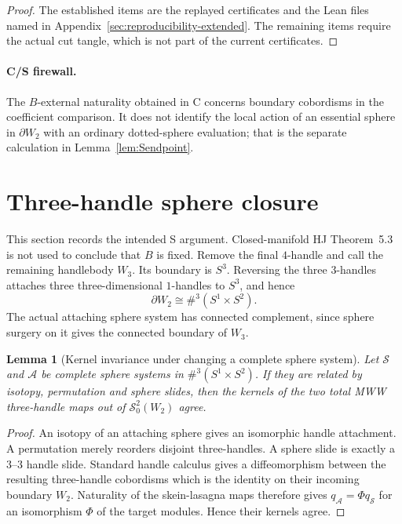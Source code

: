 \documentclass[11pt]{amsart}
\newtheorem{lemma}[theorem]{Lemma}
\theoremstyle{definition}
\theoremstyle{remark}
\begin{document}
\begin{proof}
The established items are the replayed certificates and the Lean files
named in Appendix~\ref{sec:reproducibility-extended}.  The remaining items
require the actual cut tangle, which is not part of the current
certificates.
\end{proof}

\paragraph{C/S firewall.}
The $B$-external naturality obtained in C concerns boundary cobordisms in
the coefficient comparison.  It does not identify the local action of an
essential sphere in $\partial W_2$ with an ordinary dotted-sphere evaluation;
that is the separate calculation in Lemma~\ref{lem:Sendpoint}.

\section{Three-handle sphere closure}\label{sec:s-closure}

This section records the intended S argument.  Closed-manifold HJ
Theorem~5.3 is not used to conclude that $B$ is fixed.  Remove the final $4$-handle and call the
remaining handlebody $W_3$.  Its boundary is $S^3$.  Reversing the three
$3$-handles attaches three three-dimensional $1$-handles to $S^3$, and hence
\[
\partial W_2\cong\#^3(S^1\times S^2).
\]
The actual attaching sphere system has connected complement, since sphere
surgery on it gives the connected boundary of $W_3$.

\begin{lemma}[Kernel invariance under changing a complete sphere system]
\label{lem:Ssystem}
Let \(\mathcal S\) and \(\mathcal A\) be complete sphere systems in
\(\#^3(S^1\times S^2)\).  If they are related by isotopy, permutation and
sphere slides, then the kernels of the two total MWW three-handle maps out of
\(\mathcal S^2_0(W_2)\) agree.
\end{lemma}

\begin{proof}
An isotopy of an attaching sphere gives an isomorphic handle attachment.
A permutation merely reorders disjoint three-handles.  A sphere slide is
exactly a \(3\)--\(3\) handle slide.  Standard handle calculus gives a
diffeomorphism between the resulting three-handle cobordisms which is the
identity on their incoming boundary \(W_2\).  Naturality of the skein-lasagna
maps therefore gives \(q_{\mathcal A}=\Phi q_{\mathcal S}\) for an
isomorphism \(\Phi\) of the target modules.  Hence their kernels agree.
\end{proof}
\end{document}

